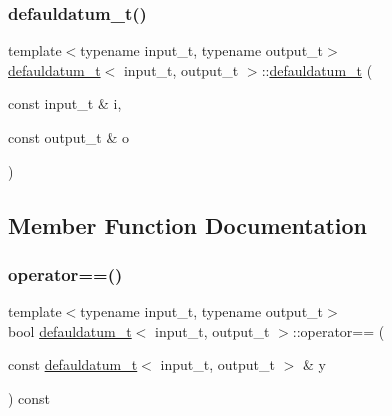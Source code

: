 \mbox{\label{classdefauldatum__t_a338eb6eda0b2c7adb2b83476b57561d3}} 
\subsubsection{\texorpdfstring{defauldatum\+\_\+t()}{defauldatum\_t()}\hspace{0.1cm}{\footnotesize\ttfamily [3/3]}}
{\footnotesize\ttfamily template$<$typename input\+\_\+t, typename output\+\_\+t$>$ \\
\hyperlink{classdefauldatum__t}{defauldatum\+\_\+t}$<$ input\+\_\+t, output\+\_\+t $>$\+::\hyperlink{classdefauldatum__t}{defauldatum\+\_\+t} (\begin{DoxyParamCaption}\item[{const input\+\_\+t \&}]{i,  }\item[{const output\+\_\+t \&}]{o }\end{DoxyParamCaption})\hspace{0.3cm}{\ttfamily [inline]}}



\subsection{Member Function Documentation}
\mbox{\label{classdefauldatum__t_a96eb1be1316177eb30d9bbc4a5405a9c}} 
\subsubsection{\texorpdfstring{operator==()}{operator==()}}
{\footnotesize\ttfamily template$<$typename input\+\_\+t, typename output\+\_\+t$>$ \\
bool \hyperlink{classdefauldatum__t}{defauldatum\+\_\+t}$<$ input\+\_\+t, output\+\_\+t $>$\+::operator== (\begin{DoxyParamCaption}\item[{const \hyperlink{classdefauldatum__t}{defauldatum\+\_\+t}$<$ input\+\_\+t, output\+\_\+t $>$ \&}]{y }\end{DoxyParamCaption}) const\hspace{0.3cm}{\ttfamily [inline]}}



